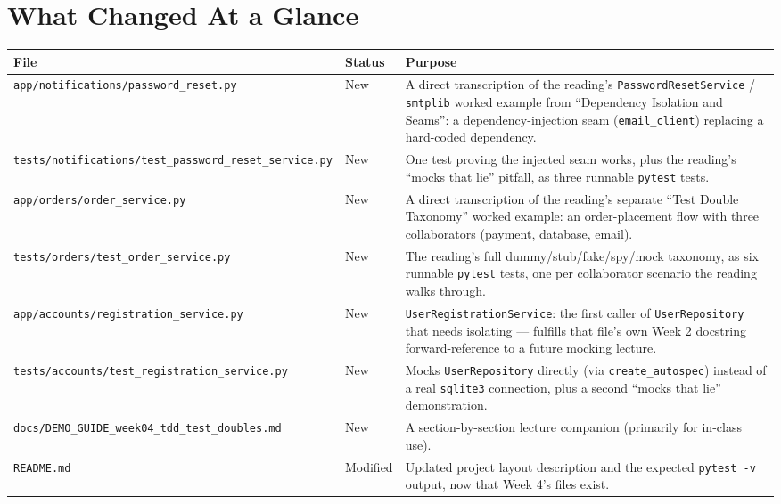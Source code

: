 \documentclass[11pt]{article}
\begin{document}
\section{What Changed At a Glance}
\begin{center}
\begin{tabular}{@{}p{5.8cm}p{1.6cm}p{7.0cm}@{}}
\toprule
\textbf{File} & \textbf{Status} & \textbf{Purpose} \\
\midrule
\texttt{app/notifications/password\_reset.py} & New & A direct
transcription of the reading's \texttt{PasswordResetService} /
\texttt{smtplib} worked example from ``Dependency Isolation and
Seams'': a dependency-injection seam (\texttt{email\_client}) replacing
a hard-coded dependency. \\
\texttt{tests/notifications/test\_password\_reset\_service.py} & New &
One test proving the injected seam works, plus the reading's ``mocks
that lie'' pitfall, as three runnable \texttt{pytest} tests. \\
\texttt{app/orders/order\_service.py} & New & A direct transcription of
the reading's separate ``Test Double Taxonomy'' worked example: an
order-placement flow with three collaborators (payment, database,
email). \\
\texttt{tests/orders/test\_order\_service.py} & New & The reading's full
dummy/stub/fake/spy/mock taxonomy, as six runnable \texttt{pytest}
tests, one per collaborator scenario the reading walks through. \\
\texttt{app/accounts/registration\_service.py} & New &
\texttt{UserRegistrationService}: the first caller of
\texttt{UserRepository} that needs isolating --- fulfills that file's
own Week 2 docstring forward-reference to a future mocking lecture. \\
\texttt{tests/accounts/test\_registration\_service.py} & New & Mocks
\texttt{UserRepository} directly (via \texttt{create\_autospec}) instead
of a real \texttt{sqlite3} connection, plus a second ``mocks that lie''
demonstration. \\
\texttt{docs/DEMO\_GUIDE\_week04\_tdd\_test\_doubles.md} & New & A
section-by-section lecture companion (primarily for in-class use). \\
\texttt{README.md} & Modified & Updated project layout description and
the expected \texttt{pytest -v} output, now that Week 4's files exist. \\
\bottomrule
\end{tabular}
\end{center}
\end{document}
